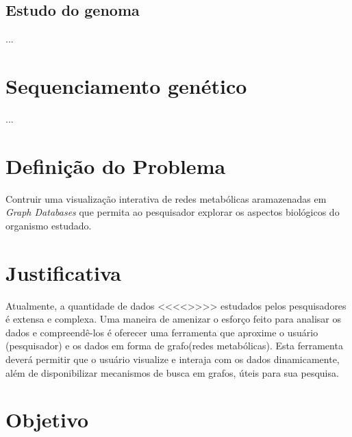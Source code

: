 \subsection{Estudo do genoma}

\indent ... 




\section{Sequenciamento genético}

\indent ...


\section{Definição do Problema}

\indent 
Contruir uma visualização interativa de redes metabólicas aramazenadas em \textit{Graph Databases} que permita ao pesquisador explorar os aspectos biológicos do organismo estudado.



\section{Justificativa}

\indent 

Atualmente, a quantidade de dados <<<<>>>> estudados pelos pesquisadores é extensa e complexa. Uma maneira de amenizar o esforço feito para analisar os dados e compreendê-los é oferecer uma ferramenta que aproxime o usuário (pesquisador) e os dados em forma de grafo(redes metabólicas). Esta ferramenta deverá permitir que o usuário visualize e interaja com os dados dinamicamente, além de disponibilizar mecanismos de busca em grafos, úteis para sua pesquisa.


\section{Objetivo}


